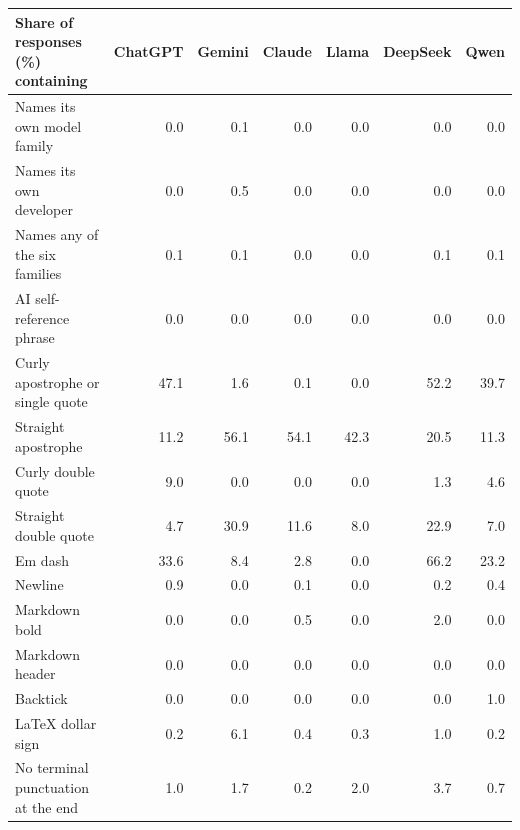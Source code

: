 \begin{tabular}{lrrrrrr}
\toprule
Share of responses (\%) containing & ChatGPT & Gemini & Claude & Llama & DeepSeek & Qwen \\
\midrule
Names its own model family & 0.0 & 0.1 & 0.0 & 0.0 & 0.0 & 0.0 \\
Names its own developer & 0.0 & 0.5 & 0.0 & 0.0 & 0.0 & 0.0 \\
Names any of the six families & 0.1 & 0.1 & 0.0 & 0.0 & 0.1 & 0.1 \\
AI self-reference phrase & 0.0 & 0.0 & 0.0 & 0.0 & 0.0 & 0.0 \\
\midrule
Curly apostrophe or single quote & 47.1 & 1.6 & 0.1 & 0.0 & 52.2 & 39.7 \\
Straight apostrophe & 11.2 & 56.1 & 54.1 & 42.3 & 20.5 & 11.3 \\
Curly double quote & 9.0 & 0.0 & 0.0 & 0.0 & 1.3 & 4.6 \\
Straight double quote & 4.7 & 30.9 & 11.6 & 8.0 & 22.9 & 7.0 \\
Em dash & 33.6 & 8.4 & 2.8 & 0.0 & 66.2 & 23.2 \\
\midrule
Newline & 0.9 & 0.0 & 0.1 & 0.0 & 0.2 & 0.4 \\
Markdown bold & 0.0 & 0.0 & 0.5 & 0.0 & 2.0 & 0.0 \\
Markdown header & 0.0 & 0.0 & 0.0 & 0.0 & 0.0 & 0.0 \\
Backtick & 0.0 & 0.0 & 0.0 & 0.0 & 0.0 & 1.0 \\
LaTeX dollar sign & 0.2 & 6.1 & 0.4 & 0.3 & 1.0 & 0.2 \\
No terminal punctuation at the end & 1.0 & 1.7 & 0.2 & 2.0 & 3.7 & 0.7 \\
\bottomrule
\end{tabular}
